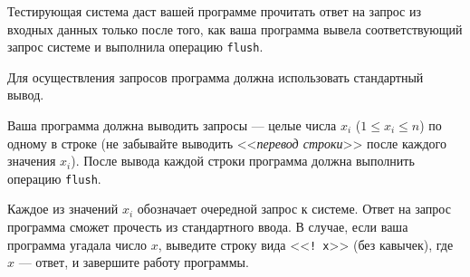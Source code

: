 Тестирующая система даст вашей программе прочитать ответ на запрос из входных данных только после того, как ваша программа вывела соответствующий запрос системе и выполнила операцию \texttt{flush}.

\OutputFile

Для осуществления запросов программа должна использовать стандартный вывод.

Ваша программа должна выводить запросы --- целые числа $x_i$ ($1 \le x_i \le n$) по одному в строке (не забывайте выводить <<\textit{перевод строки}>> после каждого значения $x_i$). После вывода каждой строки программа должна выполнить операцию \texttt{flush}.

Каждое из значений $x_i$ обозначает очередной запрос к системе. Ответ на запрос программа сможет прочесть из стандартного ввода. В случае, если ваша программа угадала число $x$, выведите строку вида <<\texttt{! x}>> (без кавычек), где $x$ --- ответ, и завершите работу программы.

\SAMPLES
